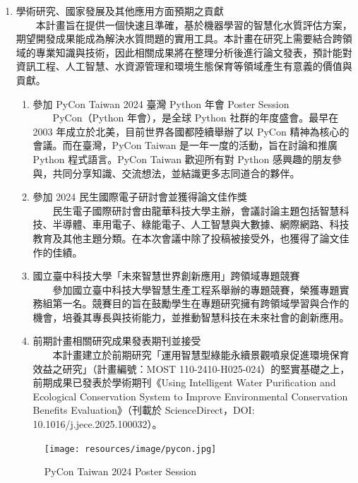 \documentclass[12pt,a4paper]{article}
\begin{document}
\begin{enumerate}
\begin{enumerate}[label=\arabic*.]
\item 學術研究、國家發展及其他應用方面預期之貢獻\\
　　本計畫旨在提供一個快速且準確，基於機器學習的智慧化水質評估方案，期望開發成果能成為解決水質問題的實用工具。本計畫在研究上需要結合跨領域的專業知識與技術，因此相關成果將在整理分析後進行論文發表，預計能對資訊工程、人工智慧、水資源管理和環境生態保育等領域產生有意義的價值與貢獻。
    \begin{enumerate}[label=3-3-\arabic*.]
        \item 參加 PyCon Taiwan 2024 臺灣 Python 年會 Poster Session\\
            　　PyCon（Python 年會），是全球 Python 社群的年度盛會。最早在 2003 年成立於北美，目前世界各國都陸續舉辦了以 PyCon 精神為核心的會議。而在臺灣，PyCon Taiwan 是一年一度的活動，旨在討論和推廣 Python 程式語言。PyCon Taiwan 歡迎所有對 Python 感興趣的朋友參與，共同分享知識、交流想法，並結識更多志同道合的夥伴。
        \item 參加 2024 民生國際電子研討會並獲得論文佳作獎\\
            　　民生電子國際研討會由龍華科技大學主辦，會議討論主題包括智慧科技、半導體、車用電子、綠能電子、人工智慧與大數據、網際網路、科技教育及其他主題分類。在本次會議中除了投稿被接受外，也獲得了論文佳作的佳績。
        \item 國立臺中科技大學「未來智慧世界創新應用」跨領域專題競賽\\
            　　參加國立臺中科技大學智慧生產工程系舉辦的專題競賽，榮獲專題實務組第一名。競賽目的旨在鼓勵學生在專題研究擁有跨領域學習與合作的機會，培養其專長與技術能力，並推動智慧科技在未來社會的創新應用。
        \item 前期計畫相關研究成果發表期刊並接受\\
            　　本計畫建立於前期研究「運用智慧型綠能永續景觀噴泉促進環境保育效益之研究」（計畫編號：MOST 110-2410-H025-024）的堅實基礎之上，前期成果已發表於學術期刊《Using Intelligent Water Purification and Ecological Conservation System to Improve Environmental Conservation Benefits Evaluation》（刊載於 ScienceDirect，DOI: 10.1016/j.jece.2025.100032）。
    \end{enumerate}
    \begin{figure}[H]
        \centering
        \begin{minipage}[t]{0.45\textwidth}
            \centering
                \texttt{[image: resources/image/pycon.jpg]}
                \caption{PyCon Taiwan 2024 Poster Session}
                \label{fig:pycon}
            \end{minipage}%

\end{figure}
\end{enumerate}
\end{enumerate}
\end{document}
